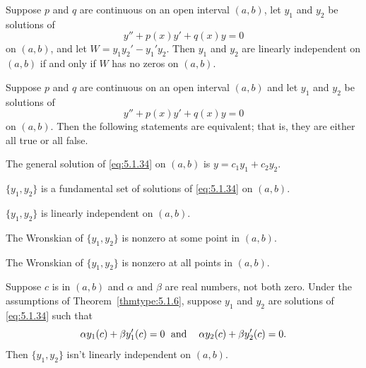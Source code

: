 \setcounter{theorem}{4}
\setcounter{equation}{31}
\begin{theorem}
  \label{thmtype:5.1.5} Suppose $p$ and $q$ are continuous on an open interval $(a,b)$, let $y_{1}$
  and $y_{2}$ be solutions of
  \begin{equation}
    \label{eq:5.1.32}y''+p(x)y'+q(x)y=0
  \end{equation}
  on $(a,b)$, and let $W=y_{1}y_{2}'-y_{1}'y_{2}$. Then $y_{1}$ and $y_{2}$ are linearly independent
  on $(a,b)$ if and only if $W$ has no zeros on $(a,b)$.
\end{theorem}

\setcounter{theorem}{5}
\setcounter{equation}{33}
\begin{theorem}
  \label{thmtype:5.1.6} Suppose $p$ and $q$ are continuous on an open interval $(a,b)$ and let
  $y_{1}$ and $y_{2}$ be solutions of
  \begin{equation}
    \label{eq:5.1.34}y''+p(x)y'+q(x)y=0
  \end{equation}
  on $(a,b)$. Then the following statements are equivalent; that is, they are either all true or all
  false.
  \begin{alist}
    \item %
    The general solution of \eqref{eq:5.1.34} on $(a,b)$ is $y=c_{1}y_{1}+c_{2}y_{2}$.

    \item %
    $\{y_{1},y_{2}\}$ is a fundamental set of solutions of \eqref{eq:5.1.34} on $(a,b)$.

    \item %
    $\{y_{1},y_{2}\}$ is linearly independent on $(a,b)$.

    \item %
    The Wronskian of $\{y_{1},y_{2}\}$ is nonzero at some point in $(a,b)$.

    \item %
    The Wronskian of $\{y_{1},y_{2}\}$ is nonzero at all points in $(a,b)$.
  \end{alist}
\end{theorem}

\setcounter{theorem}{6}
\setcounter{equation}{34}
\begin{theorem}
  \label{thmtype:5.1.7} Suppose $c$ is in $(a,b)$ and $\alpha$ and $\beta$ are real numbers, not
  both zero. Under the assumptions of Theorem~\ref{thmtype:5.1.6}, suppose $y_{1}$ and $y_{2}$ are
  solutions of \eqref{eq:5.1.34} such that
  \begin{equation}
    \label{eq:5.1.35}\alpha y_{1}(c)+\beta y_{1}'(c)=0\text{\; and\; \; }\alpha y_{2}(c)+\beta y_{2}'(c)=0.
  \end{equation}
  Then $\{y_{1},y_{2}\}$ isn't linearly independent on $(a,b)$.
\end{theorem}

